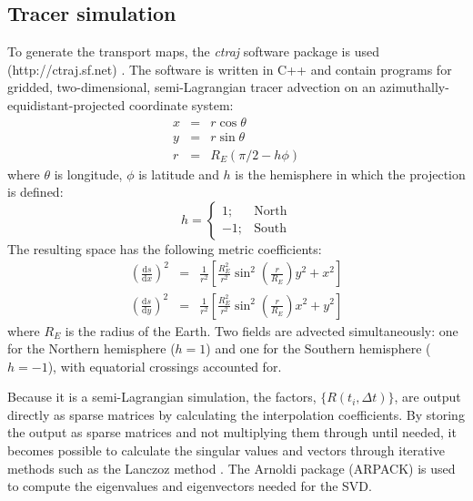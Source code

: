 \subsection{Tracer simulation}

\label{ctraj}

To generate the transport maps, the \textit{ctraj} software package is used (http://ctraj.sf.net) \citep{Mills2004,Mills2009}.  
The software is written in C++ and contain programs
for gridded, two-dimensional, semi-Lagrangian tracer advection on an 
azimuthally-equidistant-projected coordinate system:
\begin{eqnarray}
  x & = & r \cos \theta \\\nonumber
  y & = & r \sin \theta \\\nonumber
	r & = & R_E (\pi/2 - h \phi)
\end{eqnarray}
where $\theta$ is longitude, $\phi$ is latitude
and $h$ is the hemisphere in which the projection is
defined:
\begin{equation}
h = \left \lbrace \begin{array}{rl} 1; & \mathrm{North} \\ -1; & \mathrm{South} \end{array} \right .
\end{equation}
The resulting space has the following metric coefficients:
\begin{eqnarray}
\left (\frac{\mathrm ds}{\mathrm d x} \right )^2 & = & \frac{1}{r^2} \left [
	\frac{R_E^2}{r^2} \sin^2 \left (\frac{r}{R_E} \right ) 
	y^2 + x^2 \right ] \\ \nonumber
\left (\frac{\mathrm ds}{\mathrm d y} \right )^2 & = & \frac{1}{r^2} \left [
	\frac{R_E^2}{r^2} \sin^2 \left (\frac{r}{R_E} \right )
	x^2 + y^2 \right ]
	\label{metric_coef}
\end{eqnarray}
where $R_E$ is the radius of the Earth.
Two fields are advected simultaneously: one for the Northern hemisphere ($h=1$)
and one for the Southern hemisphere ($h=-1$), with equatorial crossings accounted for.

Because it is a semi-Lagrangian simulation, the factors, $\lbrace R(t_i,\Delta t) \rbrace$,
are output directly as sparse matrices by calculating the interpolation coefficients.
By storing the output as sparse matrices and not multiplying them through until
needed, it becomes possible to calculate the singular values and vectors through iterative
methods such as the Lanczoz method \citep{Golub_Van_Loan1996}.
The Arnoldi package (ARPACK) \citep{Lehoucq_Scott1996} is used to compute the
eigenvalues and eigenvectors needed for the SVD.

